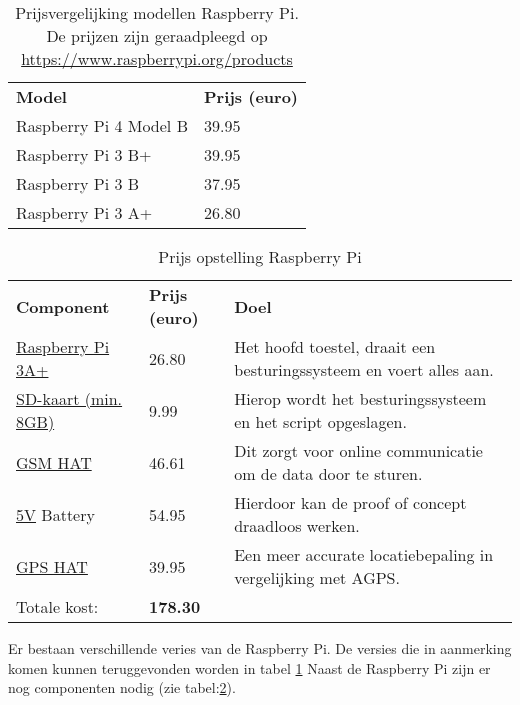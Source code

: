 \section{}
\begin{table}[]
	\begin{tabular}{ll}
		\textbf{Model}                  & \textbf{Prijs (euro)} \\
		Raspberry Pi 4 Model B & 39.95        \\
		Raspberry Pi 3 B+      & 39.95        \\
		Raspberry Pi 3 B       & 37.95        \\
		Raspberry Pi 3 A+      & 26.80       
	\end{tabular}
	\caption[Prijsvergelijking Raspberry Pi]{Prijsvergelijking modellen Raspberry Pi. De prijzen zijn geraadpleegd op \url{https://www.raspberrypi.org/products}}
	\label{tab:rpimodellen}
\end{table}
\begin{table}[]
	\begin{tabular}{llp{8cm}}
		\textbf{Component}           & \textbf{Prijs (euro)} & \textbf{Doel}\\
		\href{https://www.raspberrypi.org/products}{Raspberry Pi 3A+}    & 26.80        & Het hoofd toestel, draait een besturingssysteem en voert alles aan.\\
		\href{https://www.bol.com/nl/p/ philips-sd-kaart-8gb-sd-card-class-4/9200000023935849/?country=BE\&Referrer=ADVNLPPcefd2c00d536683c00927aff17000051123\& utm\_source=51123\&utm\_medium=Afﬁliates\&utm\_campaign=CPS\&utm\_content=txl}{SD-kaart (min. 8GB)} & 9.99         & Hierop wordt het besturingssysteem en het script opgeslagen.\\
		\href{https://www.robotshop.com/eu/ en/gsm-gprsgnssbluetooth-hat-raspberry-pi.html}{GSM HAT}             & 46.61        & Dit zorgt voor online communicatie om de data door te sturen.\\
		\href{https://www.sossolutions.nl/1566-usb-battery-pack-for-raspberry-pi-10000mah-2-x-5v-outputs?gclid=CjwKCAjwvZv0BRA8EiwAD9T2VfLwMiBk7S2IyG0X13mIPVppguIaRPsgBf2mtAYpxLGU7K8PmdalmRoCbZgQAvD\_BwE}{5V} Battery          & 54.95        & Hierdoor kan de proof of concept draadloos werken.\\
		\href{https://www.sossolutions.nl/raspberry-pi-gps-hat?gclid=CjwKCAjwvZv0BRA8EiwAD9T2VZeOJ8Gh0lykmCo9hwT2Zn5j8bvYHn\_mQX2lXPTCSkvUFwH6F3qQexoCutYQAvD\_BwE}{GPS HAT}             & 39.95        & Een meer accurate locatiebepaling in vergelijking met AGPS.\\
		Totale kost:        & \textbf{178.30}        &                                          
	\end{tabular}
	\caption{Prijs opstelling Raspberry Pi}
	\label{tab:rpi}
\end{table}
Er bestaan verschillende veries van de Raspberry Pi. De versies die in aanmerking komen kunnen teruggevonden worden in tabel \ref{tab:rpimodellen}
\newline
Naast de Raspberry Pi zijn er nog componenten nodig (zie tabel:\ref{tab:rpi}).


